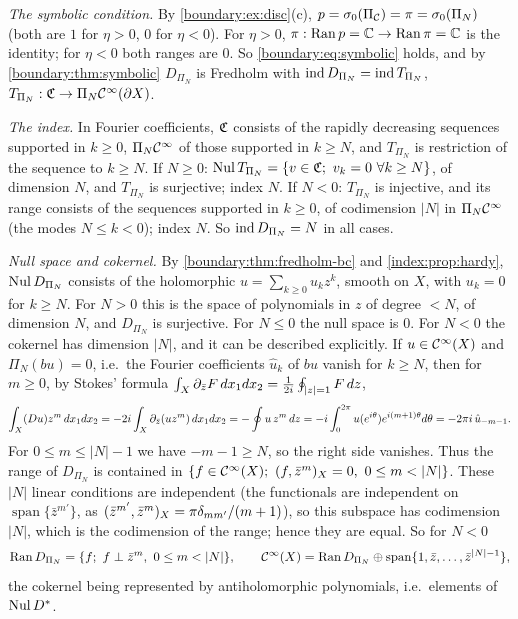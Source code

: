 \emph{The symbolic condition.} By \cref{boundary:ex:disc}(c), $p=\sigma_0(\Pi_{\mathcal{C}})=\pi=
\sigma_0(\Pi_N)$ (both are $1$ for $\eta>0$, $0$ for $\eta<0$). For $\eta>0$,
$\pi:\operatorname{Ran} p=\mathbb{C}\to\operatorname{Ran}\pi=\mathbb{C}$ is the identity; for $\eta<0$ both ranges are $0$. So
\eqref{boundary:eq:symbolic} holds, and by \cref{boundary:thm:symbolic} $D_{\Pi_N}$ is
Fredholm with $\operatorname{ind} D_{\Pi_N}=\operatorname{ind} T_{\Pi_N}$, $T_{\Pi_N}:\mathfrak{C}\to\Pi_N\mathcal{C}^\infty(\partial X)$.

\emph{The index.} In Fourier coefficients, $\mathfrak{C}$ consists of the rapidly decreasing
sequences supported in $k\ge0$, $\Pi_N\mathcal{C}^\infty$ of those supported in $k\ge N$, and
$T_{\Pi_N}$ is restriction of the sequence to $k\ge N$.
If $N\ge0$: $\operatorname{Nul} T_{\Pi_N}=\{v\in\mathfrak{C};\ v_k=0\ \forall k\ge N\}$, of dimension $N$, and
$T_{\Pi_N}$ is surjective; index $N$. If $N<0$: $T_{\Pi_N}$ is injective, and its range
consists of the sequences supported in $k\ge0$, of codimension $|N|$ in $\Pi_N\mathcal{C}^\infty$ (the
modes $N\le k<0$); index $N$. So $\operatorname{ind} D_{\Pi_N}=N$ in all cases.

\emph{Null space and cokernel.} By \cref{boundary:thm:fredholm-bc} and
\cref{index:prop:hardy}, $\operatorname{Nul} D_{\Pi_N}$ consists of the holomorphic $u=\sum_{k\ge0}
u_kz^k$, smooth on $X$, with $u_k=0$ for $k\ge N$. For $N>0$ this is the space of
polynomials in $z$ of degree $<N$, of dimension $N$, and $D_{\Pi_N}$ is surjective. For
$N\le0$ the null space is $0$. For $N<0$ the cokernel has dimension $|N|$, and it can be
described explicitly. If $u\in\mathcal{C}^\infty(X)$ and $\Pi_N(bu)=0$, i.e.\ the Fourier coefficients
$\hat u_k$ of $bu$ vanish for $k\ge N$, then for $m\ge0$, by Stokes' formula
$\int_X\partial_{\bar z}F\,dx_1dx_2=\frac1{2i}\oint_{|z|=1}F\,dz$,
\begin{equation*}
\int_X(Du)z^m\,dx_1dx_2=-2i\int_X\partial_{\bar z}(uz^m)\,dx_1dx_2=-\oint u\,z^m\,dz=
-i\int_0^{2\pi}u(e^{i\theta})e^{i(m+1)\theta}d\theta=-2\pi i\,\hat u_{-m-1}.
\end{equation*}
For $0\le m\le|N|-1$ we have $-m-1\ge N$, so the right side vanishes. Thus the range of
$D_{\Pi_N}$ is contained in $\{f\in\CI(X);\ \inner f{\bar z^m}_X=0,\ 0\le m<|N|\}$. These
$|N|$ linear conditions are independent (the functionals are independent on
$\operatorname{span}\{\bar z^{m'}\}$, as $( \bar z^{m'}, \bar z^m)_X=\pi\delta_{mm'}/
(m+1)$), so this subspace has codimension $|N|$, which is the codimension of the range;
hence they are equal. So for $N<0$
\begin{equation*}
\Ran D_{\Pi_N}=\{f;\ f\perp\bar z^m,\ 0\le m<|N|\},\qquad
\CI(X)=\Ran D_{\Pi_N}\oplus\operatorname{span}\{1,\bar z,\dots,\bar z^{|N|-1}\},
\end{equation*}
the cokernel being represented by antiholomorphic polynomials, i.e.\ elements of
$\operatorname{Nul} D^*$.

